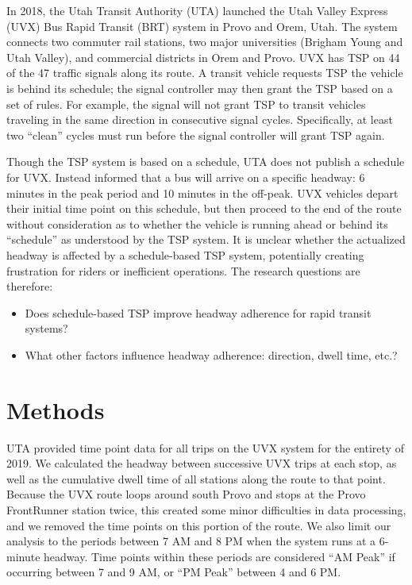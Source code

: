 \documentclass[3p, authoryear, review]{elsarticle} %
\providecommand{\tightlist}{%
  \setlength{\itemsep}{0pt}\setlength{\parskip}{0pt}}
\begin{document}
In 2018, the Utah Transit Authority (UTA) launched the Utah Valley Express (UVX)
Bus Rapid Transit (BRT) system in Provo and Orem, Utah. The system connects
two commuter rail stations, two major universities (Brigham Young and Utah Valley),
and commercial districts in Orem and Provo. UVX has TSP on 44 of the 47 traffic
signals along its route. A transit vehicle requests TSP the vehicle is behind its
schedule; the signal controller may then grant the TSP based on a set of rules.
For example, the signal will not grant TSP to transit vehicles traveling in the
same direction in consecutive signal cycles. Specifically, at least two ``clean'' cycles
must run before the signal controller will grant TSP again.

Though the TSP system is based on a schedule, UTA does not publish a schedule
for UVX. Instead informed that a bus will arrive on a specific
headway: 6 minutes in the peak period and 10 minutes in the off-peak. UVX vehicles depart
their initial time point on this schedule, but then proceed to the end of the route
without consideration as to whether the vehicle is running ahead or behind its ``schedule''
as understood by the TSP system. It is
unclear whether the actualized headway is affected by a schedule-based TSP
system, potentially creating frustration for riders or inefficient operations.
The research questions are therefore:

\begin{itemize}
\tightlist
\item
  Does schedule-based TSP improve headway adherence for rapid transit systems?
\item
  What other factors influence headway adherence: direction, dwell time, etc.?
\end{itemize}

\hypertarget{methods}{%
\section{Methods}\label{methods}}

UTA provided time point data for all trips on the UVX system for the entirety of
2019. We calculated the headway between successive UVX trips at each stop, as
well as the cumulative dwell time of all stations along the route to that point.
Because the UVX route loops around south Provo and stops at the Provo
FrontRunner station twice, this created some minor difficulties in data
processing, and we removed the time points on this portion of the route. We also
limit our analysis to the periods between 7 AM and 8 PM when the system runs at
a 6-minute headway. Time points within these periods are considered ``AM Peak'' if
occurring between 7 and 9 AM, or ``PM Peak'' between 4 and 6 PM.
\end{document}

